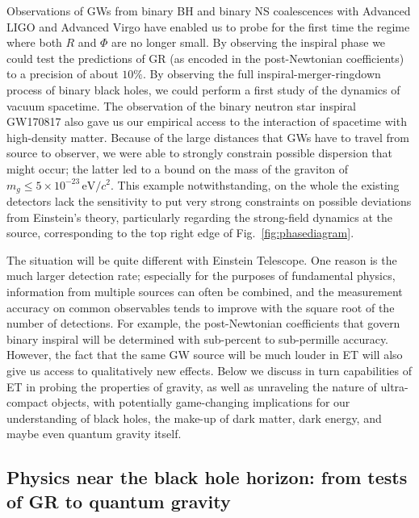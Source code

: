  
Observations of GWs from binary BH and binary  NS 
coalescences with Advanced LIGO and Advanced Virgo have enabled us to probe for the first time
the regime where both $R$ and $\Phi$ are no longer small. By observing the inspiral phase  we could test the predictions of GR (as encoded in the post-Newtonian coefficients) to a precision of about $10\%$.
By observing the full  inspiral-merger-ringdown process
of binary black holes, we could perform a first study of the dynamics of vacuum spacetime. 
The observation of the binary neutron star inspiral GW170817 also gave us our empirical 
access to the interaction of spacetime with high-density matter. Because of the large 
distances that GWs have to travel from source to observer, we were able to
strongly constrain possible dispersion that might occur; the latter led to a bound on 
the mass of the graviton of $m_g \leq 5 \times 10^{-23}\,\mbox{eV}/c^2$. This example
notwithstanding, on the whole the existing detectors lack the sensitivity to put very strong
constraints on possible deviations from Einstein's theory, particularly regarding 
the strong-field dynamics at the source, corresponding to the top right edge of 
Fig.~\ref{fig:phasediagram}. 
 
The situation will be quite different with Einstein Telescope. One reason is the much 
larger detection rate; especially for the purposes of fundamental physics, information 
from multiple sources can often be combined, and the measurement accuracy on 
common observables  
tends to improve with the square root of the number of detections. 
For example, the post-Newtonian coefficients that govern binary inspiral will be determined with sub-percent to sub-permille accuracy.
However, the fact that
the same GW source will be much louder in ET will also give us access to 
qualitatively new effects. Below we discuss in turn capabilities of ET in 
probing the properties of gravity, as well as unraveling the nature of ultra-compact
objects, with potentially game-changing implications for our understanding of black holes, 
the make-up of dark matter, dark energy, and maybe even quantum gravity itself.



\subsection{Physics near the black hole horizon: from tests of GR to quantum gravity}



\vspace{2mm}

